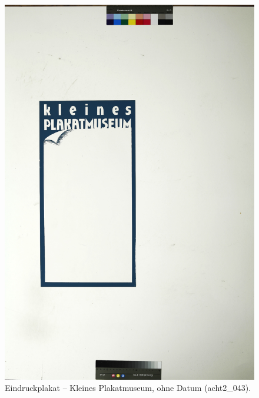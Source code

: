 \documentclass[a4paper,12pt,ngerman]{article}
\begin{document}
\newpage
\begin{figure}[ht]
\includegraphics[width=\linewidth]{Abbildung_3_(acht2_043)}
\centering
\caption{Eindruckplakat -- Kleines Plakatmuseum, ohne Datum (acht2\_043).}
\end{figure}
\end{document}
